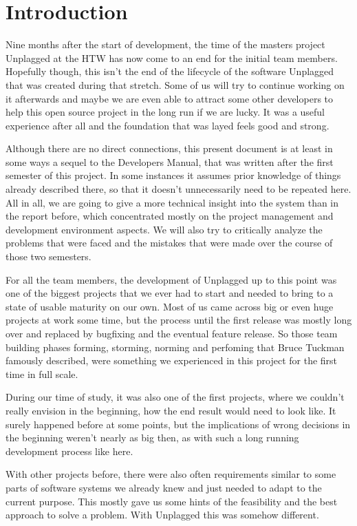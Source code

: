\chapter*{Introduction}

Nine months after the start of development, the time of the masters project Unplagged at the HTW has now come to an end for the 
initial team members. Hopefully though, 
this isn't the end of the lifecycle of the software Unplagged that was created during that stretch. Some of us will try to continue working on it afterwards and maybe we are even able to attract some other developers to help this open source project in the long run if we are lucky. It was a useful experience after all and the foundation that was layed feels good and strong.

Although there are no direct connections, this present document is at least in some ways a sequel to the Developers Manual, that was
written after the first semester of this project. In some instances it assumes prior knowledge of things already described there, so that it doesn't unnecessarily need to be repeated here.
All in all, we are going to give a more technical insight into the system than in the report before, which concentrated mostly
on the project management and development environment aspects. We will also try to critically 
analyze the problems that were faced and the mistakes that were made over the course of those
two semesters.

For all the team members, the development of Unplagged up to this point was one of 
the biggest 
projects that we ever had to start and needed to bring to a state of usable 
maturity on our own. Most of us came across big or even huge projects at work some time, but the process until 
the first release was mostly long over and replaced by bugfixing and the eventual feature release.
So those team building phases forming, storming, norming and perfoming that Bruce Tuckman famously described\citep{tuckman1965},
were something we experienced in this project for the first time in full scale.

During our time of study, it was also one of the first projects, 
where we couldn't really envision in the beginning, how the end result would need to look like. It surely happened before at some points, but the implications of wrong decisions in the beginning weren't nearly as big then, as with such a long running development process like here.

With other projects before, there were also often requirements similar to some
parts of software systems we already knew and just needed to adapt to the current purpose.
This mostly gave us some hints of the feasibility and the best approach to solve a problem.
With Unplagged this was somehow different.

